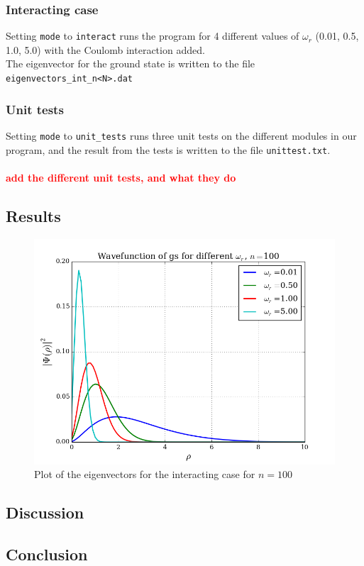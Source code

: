 \documentclass{article}
\newcommand\red[1]{\textcolor{red}{\textbf{#1}}}
\begin{document}
\subsubsection{Interacting case}
Setting \texttt{mode} to \texttt{interact} runs the program for 4 different values of $\omega_r$ (0.01, 0.5, 1.0, 5.0) with the Coulomb interaction added.\\The eigenvector for the ground state is written to the file \texttt{eigenvectors\_int\_n<N>.dat}
\subsubsection{Unit tests}
Setting \texttt{mode} to \texttt{unit\_tests} runs three unit tests on the different modules in our program, and the result from the tests is written to the file \texttt{unittest.txt}.
\\\\\red{add the different unit tests, and what they do}
\subsection{Results}
\begin{figure}[H]
  \centering
  \includegraphics[scale=0.5]{../figures/eigvec_two-int_n100.png}
  \caption{Plot of the eigenvectors for the interacting case for $n=100$}
  \label{fig:eigvec100}
\end{figure}
\subsection{Discussion}

\subsection{Conclusion}

\end{document}
